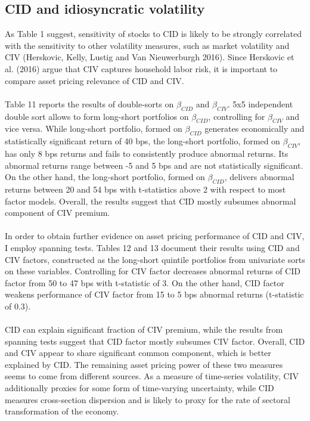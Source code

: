 \documentclass[12pt]{article}
\begin{document}
\subsection{CID and idiosyncratic volatility}
As Table 1 suggest, sensitivity of stocks to CID is likely to be strongly correlated with the sensitivity to other volatility measures, such as market volatility and CIV (Herskovic, Kelly, Lustig and Van Nieuwerburgh 2016). Since Herskovic et al. (2016) argue that CIV captures household labor risk, it is important to compare asset pricing relevance of CID and CIV. 
\paragraph{}
Table 11 reports the results of double-sorts on $\beta_{CID}$ and $\beta_{CIV}$. 5x5 independent double sort allows to form long-short portfolios on $\beta_{CID}$, controlling for $\beta_{CIV}$ and vice versa. While long-short portfolio, formed on $\beta_{CID}$ generates economically and statistically significant return of 40 bps, the long-short portfolio, formed on $\beta_{CIV}$, has only 8 bps returns and fails to consistently produce abnormal returns. Its abnormal returns range between -5 and 5 bps and are not statistically significant. On the other hand, the long-short portfolio, formed on $\beta_{CID}$, delivers abnormal returns between 20 and 54 bps with t-statistics above 2 with respect to most factor models. Overall, the results suggest that CID mostly subsumes abnormal component of CIV premium.
\paragraph{}
In order to obtain further evidence on asset pricing performance of CID and CIV, I employ spanning tests. Tables 12 and 13 document their results using CID and CIV factors, constructed as the long-short quintile portfolios from univariate sorts on these variables. Controlling for CIV factor decreases abnormal returns of CID factor from 50 to 47 bps with t-statistic of 3. On the other hand, CID factor weakens performance of CIV factor from 15 to 5 bps abnormal returns (t-statistic of 0.3). 
\paragraph{}
CID can explain significant fraction of CIV premium, while the results from spanning tests suggest that CID factor mostly subsumes CIV factor. Overall, CID and CIV appear to share significant common component, which is better explained by CID. The remaining asset pricing power of these two measures seems to come from different sources. As a measure of time-series volatility, CIV additionally proxies for some form of time-varying uncertainty, while CID measures cross-section dispersion and is likely to proxy for the rate of sectoral transformation of the economy.
\end{document}
